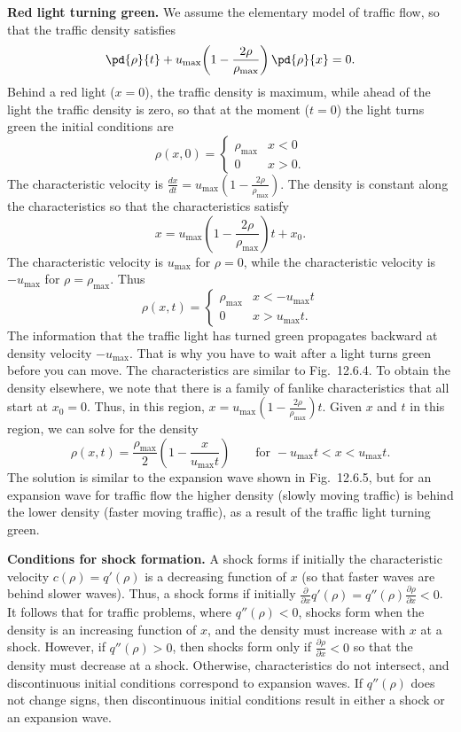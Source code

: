 \textbf{Red light turning green.}  We assume the elementary model of traffic flow, so that the traffic density satisfies
\[
\pd{\rho}{t} + u_{\max}\!\left(1 - \frac{2\rho}{\rho_{\max}}\right)\pd{\rho}{x} = 0.
\]
Behind a red light ($x = 0$), the traffic density is maximum, while ahead of the light the traffic density is zero, so that at the moment ($t = 0$) the light turns green the initial conditions are
\[
\rho(x,0) = \begin{cases} \rho_{\max} & x < 0 \\ 0 & x > 0. \end{cases}
\]
The characteristic velocity is $\frac{dx}{dt} = u_{\max}(1 - \frac{2\rho}{\rho_{\max}})$.  The density is constant along the characteristics so that the characteristics satisfy
\[
x = u_{\max}\!\left(1 - \frac{2\rho}{\rho_{\max}}\right)t + x_0.
\]
The characteristic velocity is $u_{\max}$ for $\rho = 0$, while the characteristic velocity is $-u_{\max}$ for $\rho = \rho_{\max}$.  Thus
\[
\rho(x,t) = \begin{cases} \rho_{\max} & x < -u_{\max}t \\ 0 & x > u_{\max}t. \end{cases}
\]
The information that the traffic light has turned green propagates backward at density velocity $-u_{\max}$.  That is why you have to wait after a light turns green before you can move.  The characteristics are similar to Fig.~12.6.4.  To obtain the density elsewhere, we note that there is a family of fanlike characteristics that all start at $x_0 = 0$.  Thus, in this region, $x = u_{\max}(1 - \frac{2\rho}{\rho_{\max}})t$.  Given $x$ and $t$ in this region, we can solve for the density
\[
\rho(x,t) = \frac{\rho_{\max}}{2}\!\left(1 - \frac{x}{u_{\max}t}\right) \qquad \text{for } -u_{\max}t < x < u_{\max}t.
\]
The solution is similar to the expansion wave shown in Fig.~12.6.5, but for an expansion wave for traffic flow the higher density (slowly moving traffic) is behind the lower density (faster moving traffic), as a result of the traffic light turning green.

\textbf{Conditions for shock formation.}  A shock forms if initially the characteristic velocity $c(\rho) = q'(\rho)$ is a decreasing function of $x$ (so that faster waves are behind slower waves).  Thus, a shock forms if initially $\frac{\partial}{\partial x}q'(\rho) = q''(\rho)\frac{\partial\rho}{\partial x} < 0$.  It follows that for traffic problems, where $q''(\rho) < 0$, shocks form when the density is an increasing function of $x$, and the density must increase with $x$ at a shock.  However, if $q''(\rho) > 0$, then shocks form only if $\frac{\partial\rho}{\partial x} < 0$ so that the density must decrease at a shock.  Otherwise, characteristics do not intersect, and discontinuous initial conditions correspond to expansion waves.  If $q''(\rho)$ does not change signs, then discontinuous initial conditions result in either a shock or an expansion wave.

